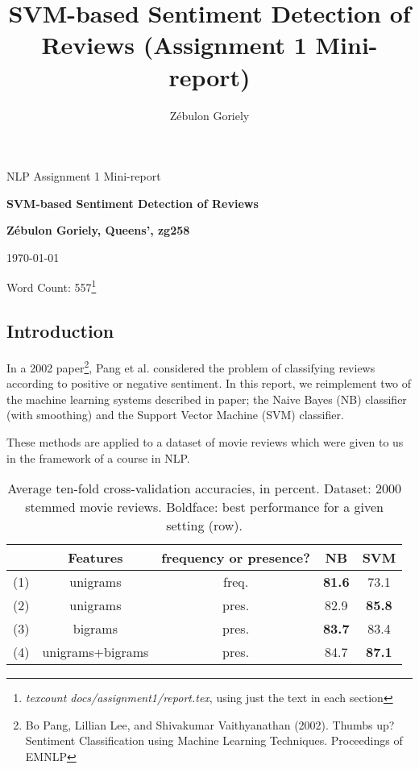 \documentclass[12pt]{article}
\title{\bf{SVM-based Sentiment Detection of Reviews (Assignment 1 Mini-report)}}
\author{\Large{Z\'ebulon Goriely}}
\begin{document}
\centerline{\large NLP Assignment 1 Mini-report}
\vspace{0.2in}
\centerline{\Large\bf SVM-based Sentiment Detection of Reviews}
\vspace{0.2in}
\centerline{\large {\bf{Z\'ebulon Goriely, Queens', zg258}}}
\vspace{0.2in}
\centerline{\large {\today}}
\vspace{0.1in}
\centerline{Word Count: 557\footnote{\emph{texcount docs/assignment1/report.tex}, using just the text in each section}}
\vspace{0.2in}

\begin{multicols}{2}

\section{Introduction}

In a 2002 paper\footnote{Bo Pang, Lillian Lee, and Shivakumar Vaithyanathan (2002). Thumbs up? Sentiment Classification using Machine Learning Techniques. Proceedings of EMNLP}, Pang et al. considered the problem of classifying reviews according to positive or negative sentiment. In this report, we reimplement two of the machine learning systems described in paper; the Naive Bayes (NB) classifier (with smoothing) and the Support Vector Machine (SVM) classifier.

These methods are applied to a dataset of movie reviews which were given to us in the framework of a course in NLP.

\begin{table*}[t]
\centering
 \begin{tabular}{| c | c | c ||c|c|} 
 \hline
   & Features & frequency or presence? & NB & SVM\\ [0.5ex] 
 \hline\hline
 (1) & unigrams & freq. & \bf{81.6} & 73.1\\ 
 \hline
 (2) & unigrams & pres. & 82.9 & \bf{85.8}\\
 \hline
 (3) & bigrams & pres. & \bf{83.7} & 83.4 \\
 \hline
 (4) & unigrams+bigrams & pres. & 84.7 & \bf{87.1} \\
 \hline
\end{tabular}
\caption{Average ten-fold cross-validation accuracies, in percent. Dataset: 2000 stemmed movie reviews. Boldface: best performance for a given setting (row).} \label{table:accuracies}
\end{table*}


\end{multicols}
\end{document}
